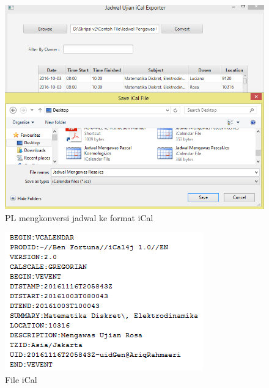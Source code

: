 		\begin{figure}[H]
		\centering
		\includegraphics[scale=0.6]{Gambar/konversiiCalEksperimental}
		\caption{PL mengkonversi jadwal ke format iCal}
		\label{fig:konversiiCalEksperimental}
		\end{figure}
		
		\begin{figure}[H]
		\centering
		\includegraphics[scale=0.8]{Gambar/fileiCalEksperimental}
		\caption{File iCal}
		\label{fig:fileiCalEksperimental}
		\end{figure}
	
